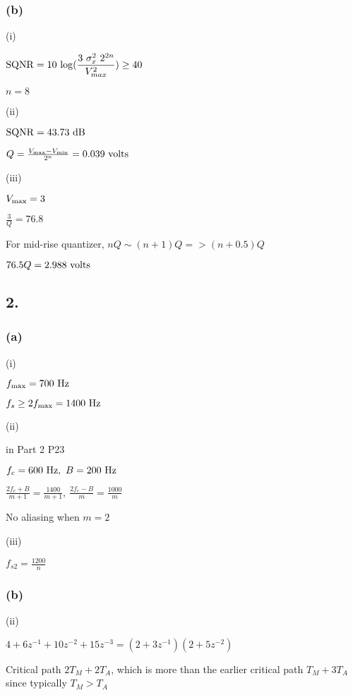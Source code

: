 \documentclass{article}
\begin{document}
\subsubsection*{(b)}
(i)\par
${\rm SQNR} = 10 \ {\rm log} (\dfrac{3 \ \sigma_{x}^{2} \ 2^{2n}}{V_{max}^{2}}) \geq 40$\par
$n=8$\par\indent
\par
(ii)\par
${\rm SQNR} = 43.73 \ {\rm dB}$\par
$Q=\frac{V_{\rm max}-V_{\rm min}}{2^{n}}=0.039 \ {\rm volts}$\par\indent
\par
(iii)\par
$V_{\rm max}=3$\par
$\frac{3}{Q}=76.8$\par
For mid-rise quantizer, $nQ \sim (n+1)Q => (n+0.5)Q$\par
$76.5Q=2.988 \ {\rm volts}$


\subsection*{2.}
\subsubsection*{(a)}
(i)\par
$f_{\rm max}=700 \ {\rm Hz}$\par
$f_{s} \geq 2f_{\rm max}=1400 \ {\rm Hz}$\par\indent
\par
(ii)\par
in Part  2 P23\par
$f_{c}=600 \ {\rm Hz}, \ B=200\ {\rm Hz}$\par
$\frac{2f_{c}+B}{m+1}=\frac{1400}{m+1}, \ \frac{2f_{c}-B}{m}=\frac{1000}{m}$\par
No aliasing when $m=2$\par\indent
\par
(iii)\par
$f_{s2}=\frac{1200}{n}$

\subsubsection*{(b)}
(ii)\par
$4+6z^{-1}+10z^{-2}+15z^{-3}=(2+3z^{-1})(2+5z^{-2})$\par
Critical path $2T_{M}+2T_{A}$, which is more than the earlier critical path $T_{M}+3T_{A}$ since typically $T_{M} > T_{A}$
\end{document}
